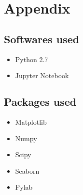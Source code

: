 \documentclass[11pt,a4paper,titlepage]{article}
\begin{document}
\section{Appendix}
\color{blue}
\subsection{Softwares used}
\begin{itemize}
\item Python 2.7
\item Jupyter Notebook
\end{itemize}
\subsection{Packages used}
\begin{itemize}
\item Matplotlib
\item Numpy
\item Scipy
\item Seaborn
\item Pylab
\end{itemize}
\end{document}
